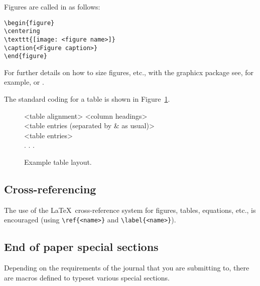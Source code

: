 \documentclass[Afour,sageh,times,doublespace]{sagej}
\begin{document}
Figures are called in as follows:
\begin{verbatim}
\begin{figure}
\centering
\texttt{[image: <figure name>]}
\caption{<Figure caption>}
\end{figure}
\end{verbatim}

For further details on how to size figures, etc., with the
\textsf{graphicx} package see, for example, \cite{R1}
or \cite{R3}.

The standard coding for a table is shown in Figure~\ref{F2}.

\begin{figure}
\setlength{\fboxsep}{0pt}%
\setlength{\fboxrule}{0pt}%
\begin{center}
\begin{boxedverbatim}
\begin{table}
\small\sf\centering
\caption{<Table caption.>}
\begin{tabular}{<table alignment>}
\toprule
<column headings>\\
\midrule
<table entries
(separated by & as usual)>\\
<table entries>\\
.
.
.\\
\bottomrule
\end{tabular}
\end{table}
\end{boxedverbatim}
\end{center}
\caption{Example table layout.\label{F2}}
\end{figure}

\subsection{Cross-referencing}
The use of the \LaTeX\ cross-reference system
for figures, tables, equations, etc., is encouraged
(using \verb"\ref{<name>}" and \verb"\label{<name>}").

\subsection{End of paper special sections}
Depending on the requirements of the journal that you are submitting to,
there are macros defined to typeset various special sections. \pagebreak
\end{document}
